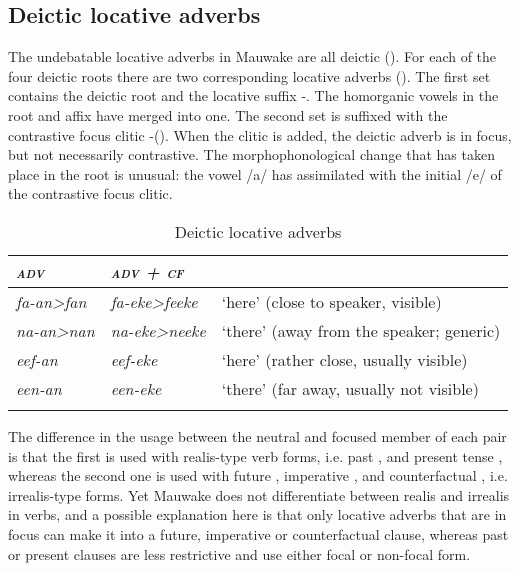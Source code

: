 \subsection{Deictic locative adverbs} \label{sec:3.6.3}
{}
The undebatable locative adverbs in Mauwake are all deictic (). For each of the four deictic roots there are two corresponding locative adverbs (). The first set contains the deictic root and the locative suffix -. The homorganic vowels in the root and affix have merged into one. The second set is suffixed with the contrastive focus clitic -(). When the clitic is added, the deictic adverb is in focus, but not necessarily contrastive. The morphophonological change that has taken place in the root is unusual: the vowel /a/ has assimilated with the initial /e/ of the contrastive focus clitic. 

\begin{table}
\caption{Deictic locative adverbs}
\label{tab:3:deicticlocadv}
 
\begin{tabular}{>{\itshape}l>{\itshape}ll}
\mytoprule
\upshape\scshape adv & \upshape\scshape adv + cf &\\
\midrule
fa-an{\textgreater}fan &fa-eke{\textgreater}feeke &`here' (close to speaker, visible) \\
na-an{\textgreater}nan &na-eke{\textgreater}neeke &`there' (away from the speaker; generic)\\
eef-an &eef-eke &`here' (rather close, usually visible)\\
een-an &een-eke &`there' (far away, usually not visible)\\
\mybottomrule
\end{tabular}
\end{table}


The difference in the usage between the neutral and focused member of each pair is that the first is  used with realis-type verb forms, i.e. past ,  and present tense , whereas the second one is  used with future , imperative , and counterfactual , i.e. irrealis-type forms. Yet Mauwake does not differentiate between realis and irrealis in verbs, and a possible explanation here is that only locative adverbs that are in focus can make it into a future, imperative or counterfactual clause, whereas past or present clauses are less restrictive and use either focal or non-focal form. 

